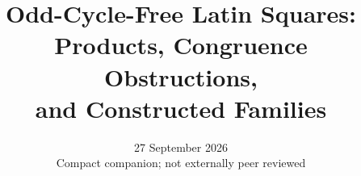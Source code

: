 \documentclass[11pt]{article}
\title{Odd-Cycle-Free Latin Squares:\\
Products, Congruence Obstructions,\\
and Constructed Families}
\author{}
\date{27 September 2026\\\small Compact companion; not externally peer reviewed}
\begin{document}
\maketitle















\footnotesize


\end{document}

